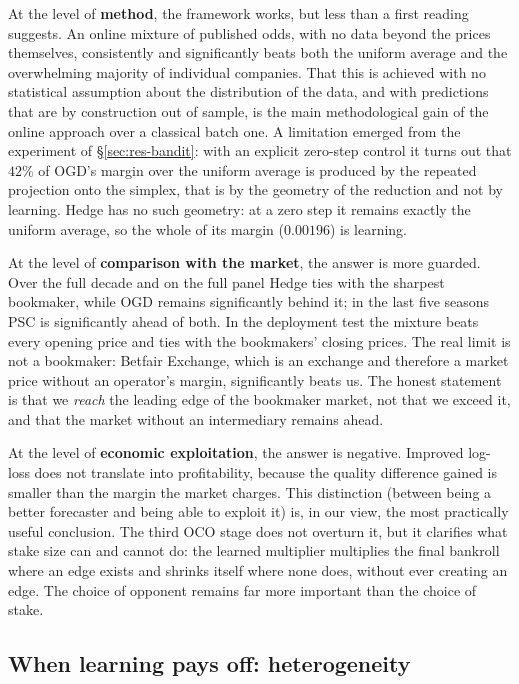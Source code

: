 \documentclass[12pt,a4paper,oneside]{report}
\renewcommand{\_}{\oldunderscore\allowbreak}
\theoremstyle{definition}
\theoremstyle{plain}
\theoremstyle{definition}   %
\begin{document}
At the level of \textbf{method}, the framework works, but less than a first reading suggests. An
online mixture of published odds, with no data beyond the prices themselves, consistently and
significantly beats both the uniform average and the overwhelming majority of individual
companies. That this is achieved with no statistical assumption about the distribution of the
data, and with predictions that are by construction out of sample, is the main methodological
gain of the online approach over a classical batch one. A limitation emerged from the
experiment of \S\ref{sec:res-bandit}: with an explicit zero-step control it turns out that $42\%$
of OGD's margin over the uniform average is produced by the repeated projection onto the simplex,
that is by the geometry of the reduction and not by learning. Hedge has no such geometry: at a
zero step it remains exactly the uniform average, so the whole of its margin ($0.00196$) is
learning.

At the level of \textbf{comparison with the market}, the answer is more guarded. Over the full
decade and on the full panel Hedge ties with the sharpest bookmaker, while OGD remains
significantly behind it; in the last five seasons PSC is significantly ahead of both. In the
deployment test the mixture beats every opening price and ties with the bookmakers' closing
prices. The real
limit is not a bookmaker: Betfair Exchange, which is an exchange and therefore a market price
without an operator's margin, significantly beats us. The honest statement is that we
\emph{reach} the leading edge of the bookmaker market, not that we exceed it, and that the market
without an intermediary remains ahead.

At the level of \textbf{economic exploitation}, the answer is negative. Improved log-loss does
not translate into profitability, because the quality difference gained is smaller than the
margin the market charges. This distinction (between being a better forecaster and being able
to exploit it) is, in our view, the most practically useful conclusion. The third OCO stage
does not overturn it, but it clarifies what stake size can and cannot do: the learned
multiplier multiplies the final bankroll where an edge exists and shrinks itself where none
does, without ever creating an edge. The choice of opponent remains far more important than the
choice of stake.

\subsection{When learning pays off: heterogeneity}
\label{sec:disc-hetero}
\end{document}
